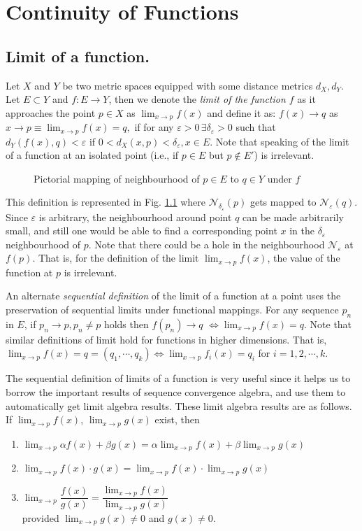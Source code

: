 \chapter{Continuity of Functions}

\section{Limit of a function.}
Let $X$ and $Y$ be two metric spaces equipped with some distance metrics $d_X, d_Y$.
Let $E\subset Y$ and $f:E\to Y$, then we denote the \textit{limit of the function $f$} as it approaches the point $p\in X$ as $\lim_{x\to p}f(x)$ and define it as:
$f(x)\to q$ as $x\to p\equiv \lim_{x\to p} f(x)=q,$ if for any $\varepsilon>0\,\exists \delta_\varepsilon>0$ such that $d_Y(f(x),q) < \varepsilon$ if $0<d_X(x,p)<\delta_\varepsilon, x\in E$.
Note that speaking of the limit of a function at an isolated point (i.e., if $p\in E$ but $p\notin E'$) is irrelevant.
\begin{figure}[!ht]
    \centering
    \scalebox{.80}{}
    \caption{Pictorial mapping of neighbourhood of $p\in E$ to $q\in Y$ under $f$}
    \label{fig:contNeigh}
\end{figure}

This definition is represented in Fig. \ref{fig:contNeigh} where $\mathcal{N}_{\delta_\varepsilon}(p)$ gets mapped to $\mathcal{N}_\varepsilon (q)$.
Since $\varepsilon$ is arbitrary, the neighbourhood around point $q$ can be made arbitrarily small, and still one would be able to find a corresponding point $x$ in the $\delta_\varepsilon$ neighbourhood of $p$.
Note that there could be a hole in the neighbourhood $\mathcal{N}_{\varepsilon}$ at $f(p)$.
That is, for the definition of the limit $\lim_{x\to p} f(x)$, the value of the function at $p$ is irrelevant.

An alternate \textit{sequential definition} of the limit of a function at a point uses the preservation of sequential limits under functional mappings.
For any sequence $p_n$ in $E$, if $p_n\to p, p_n\neq p$ holds then $f(p_n)\to q$ $\iff \lim_{x\to p}f(x)=q$.
Note that similar definitions of limit hold for functions in higher dimensions.
That is, $\lim_{x\to p}f(x)=q=(q_1,\cdots,q_k) \iff \lim_{x\to p}f_i(x)=q_i$ for $i=1,2,\cdots,k$.

The sequential definition of limits of a function is very useful since it helps us to borrow the important results of sequence convergence algebra, and use them to automatically get limit algebra results.
These limit algebra results are as follows.
If $\lim_{x\to p}f(x)$, $\lim_{x\to p}g(x)$ exist, then
\begin{enumerate}[label=(\roman*)]
    \item  $\lim_{x\to p}\alpha f(x) + \beta g(x) = \alpha \lim_{x\to p}f(x) + \beta \lim_{x\to p} g(x)$
    \item $\lim_{x\to p} f(x)\cdot g(x) = \lim_{x\to p}f(x)\cdot \lim_{x\to p}g(x)$
    \item $\lim_{x\to p} \dfrac{f(x)}{g(x)} = \dfrac{\lim_{x\to p}f(x)}{\lim_{x\to p}g(x)}$\\
    provided $\lim_{x\to p}g(x)\neq 0$ and $g(x)\neq 0$.
\end{enumerate}

